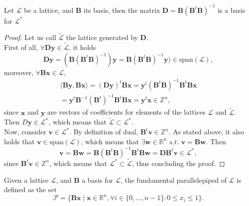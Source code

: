 \begin{theorem}
Let $\mathscr{L}$ be a lattice, and $\mathbf{B}$ its basis, then the matrix $\mathbf{D}=\mathbf{B}(\mathbf{B}^{t}\mathbf{B})^{-1}$ is a basis for $\mathscr{L}^*$
\end{theorem}
\begin{proof}
Let us call $\tilde{\mathscr{L}}$ the lattice generated by $\mathbf{D}$.\\
First of all, $\forall{\mathbf{Dy}} \in \tilde{\mathscr{L}}$, it holds
\begin{equation*}
\mathbf{Dy} = (\mathbf{B}(\mathbf{B}^{t}\mathbf{B})^{-1})\mathbf{y} = \mathbf{B}(\mathbf{B}^{t}\mathbf{B})^{-1}\mathbf{y}) \in \mathrm{span}(\mathscr{L}),
\end{equation*}
moreover, $\forall \mathbf{Bx}\in\mathscr{L}$,
\begin{equation*}
\begin{aligned}
\langle \mathbf{By},\mathbf{Bx} \rangle = (\mathbf{Dy})^{t}\mathbf{Bx} = \mathbf{y}^{t} (\mathbf{B}^t\mathbf{B})^{-1}\mathbf{B}^t\mathbf{B}\mathbf{x}\\
= \mathbf{y}^{t} \mathbf{B}^{-1}(\mathbf{B}^t)^{-1}\mathbf{B}^t\mathbf{Bx} = \mathbf{y}^t\mathbf{x} \in \mathbb{Z}^n,
\end{aligned}
\end{equation*}
since $\mathbf{x}$ and $\mathbf{y}$ are vectors of coefficients for elements of the lattices $\mathscr{L}$ and $\tilde{\mathscr{L}}$. Then $D\mathbf{y}\in\mathscr{L}^*$, which means that $\tilde{\mathscr{L}}\subset\mathscr{L}^*$.\\
Now, consider $\mathbf{v}\in\mathscr{L}^*$. By definition of dual, $\mathbf{B}^t\mathbf{v}\in\mathbb{Z}^n$. As stated above, it also holds that $\mathbf{v}\in \mathrm{span}(\mathscr{L})$, which means that $\exists\mathbf{w}\in\mathbb{R}^n$ $s.t.$ $\mathbf{v}=\mathbf{Bw}$. Then
\begin{equation*}
\mathbf{v} = \mathbf{Bw} = \mathbf{B}(\mathbf{B}^t\mathbf{B})^{-1}\mathbf{B}^t\mathbf{B}\mathbf{w} = \mathbf{DB}^t\mathbf{v} \in \mathscr{L}^*,
\end{equation*}
since $\mathbf{B}^t\mathbf{v}\in\mathbb{Z}^n$, which means that $\mathscr{L}^*\subset\tilde{\mathscr{L}}$, thus concluding the proof.
\end{proof}

\begin{definition}
Given a lattice $\mathscr{L}$, and $\mathbf{B}$ a basis for $\mathscr{L}$, the fundamental parallelepiped of $\mathscr{L}$ is defined as the set
\begin{equation*}
\mathscr{P} = \{\mathbf{Bx}\mid\mathbf{x}\in\mathbb{R}^n, \forall i \in \{0,\ldots,n-1\}:0\leq x_i \leq 1 \}.
\end{equation*}
\end{definition}

